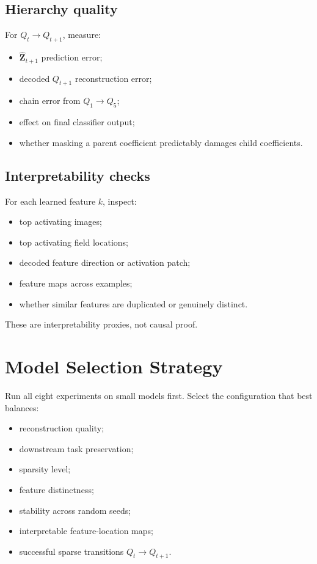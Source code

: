 \documentclass[11pt]{article}
\newcommand{\Zhat}{\widehat{\mathbf{Z}}}
\begin{document}
\subsection{Hierarchy quality}

For \(Q_t \rightarrow Q_{t+1}\), measure:
\begin{itemize}[leftmargin=*]
    \item \(\Zhat_{t+1}\) prediction error;
    \item decoded \(Q_{t+1}\) reconstruction error;
    \item chain error from \(Q_1 \rightarrow Q_5\);
    \item effect on final classifier output;
    \item whether masking a parent coefficient predictably damages child coefficients.
\end{itemize}

\subsection{Interpretability checks}

For each learned feature \(k\), inspect:
\begin{itemize}[leftmargin=*]
    \item top activating images;
    \item top activating field locations;
    \item decoded feature direction or activation patch;
    \item feature maps across examples;
    \item whether similar features are duplicated or genuinely distinct.
\end{itemize}

These are interpretability proxies, not causal proof.

\section{Model Selection Strategy}

Run all eight experiments on small models first. Select the configuration that best balances:

\begin{itemize}[leftmargin=*]
    \item reconstruction quality;
    \item downstream task preservation;
    \item sparsity level;
    \item feature distinctness;
    \item stability across random seeds;
    \item interpretable feature-location maps;
    \item successful sparse transitions \(Q_t \rightarrow Q_{t+1}\).
\end{itemize}
\end{document}
